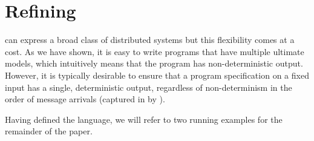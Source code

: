 \section{Refining \large \bf \lang}
\label{sec:confluence}


\lang can express a broad class of distributed systems but this flexibility comes at a cost.
As we have shown, it is easy to write programs that have multiple ultimate models, which intuitively means that the program has non-deterministic output.
However, it is typically desirable to ensure that a program specification on a fixed input has a single, deterministic output, regardless of non-determinism in the order of message arrivals (captured in \lang by ).  

Having defined the \lang language, we will refer to two running examples for the remainder of the paper.  

